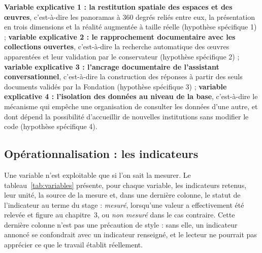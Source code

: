 \textbf{Variable explicative 1 : la restitution spatiale des espaces et des
œuvres}, c'est-à-dire les panoramas à 360 degrés reliés entre eux, la
présentation en trois dimensions et la réalité augmentée à taille réelle
(hypothèse spécifique 1) ; \textbf{variable explicative 2 : le rapprochement
documentaire avec les collections ouvertes}, c'est-à-dire la recherche
automatique des œuvres apparentées et leur validation par le conservateur
(hypothèse spécifique 2) ; \textbf{variable explicative 3 : l'ancrage
documentaire de l'assistant conversationnel}, c'est-à-dire la construction des
réponses à partir des seuls documents validés par la Fondation (hypothèse
spécifique 3) ; \textbf{variable explicative 4 : l'isolation des données au
niveau de la base}, c'est-à-dire le mécanisme qui empêche une organisation de
consulter les données d'une autre, et dont dépend la possibilité d'accueillir
de nouvelles institutions sans modifier le code (hypothèse spécifique 4).

\subsection{Opérationnalisation : les indicateurs}

Une variable n'est exploitable que si l'on sait la mesurer. Le
tableau~\ref{tab:variables} présente, pour chaque variable, les indicateurs
retenus, leur unité, la source de la mesure et, dans une dernière colonne, le
statut de l'indicateur au terme du stage : \emph{mesuré}, lorsqu'une valeur a
effectivement été relevée et figure au chapitre~3, ou \emph{non mesuré} dans le
cas contraire. Cette dernière colonne n'est pas une précaution de style : sans
elle, un indicateur annoncé se confondrait avec un indicateur renseigné, et le
lecteur ne pourrait pas apprécier ce que le travail établit réellement.

